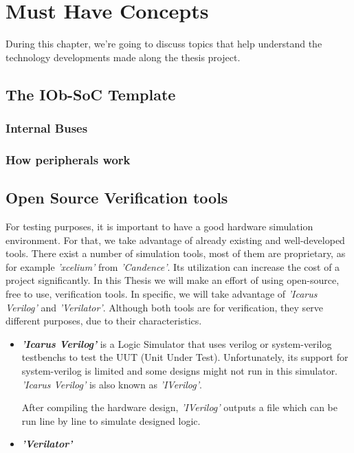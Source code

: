 \chapter{Must Have Concepts}
During this chapter, we're going to discuss topics that help understand the technology developments made along the thesis project.

\section{The IOb-SoC Template}
\subsection{Internal Buses}
\subsection{How peripherals work}

\section{Open Source Verification tools}
For testing purposes, it is important to have a good hardware simulation environment. For that, we take advantage of already existing and well-developed tools. There exist a number of simulation tools, most of them are proprietary, as for example \textit{'xcelium'} from \textit{'Candence'}. Its utilization can increase the cost of a project significantly. In this Thesis we will make an effort of using open-source, free to use, verification tools. In specific, we will take advantage of \textit{'Icarus Verilog'} and \textit{'Verilator'}. Although both tools are for verification, they serve different purposes, due to their characteristics.

\begin{itemize}
    \item \textbf{\textit{'Icarus Verilog'}} is a Logic Simulator that uses verilog or system-verilog testbenchs to test the UUT (Unit Under Test). Unfortunately, its support for system-verilog is limited and some designs might not run in this simulator. \textit{'Icarus Verilog'} is also known as \textit{'IVerilog'}.
    
    After compiling the hardware design, \textit{'IVerilog'} outputs a file which can be run line by line to simulate designed logic.
    
    \item \textbf{\textit{'Verilator'}}
\end{itemize}


